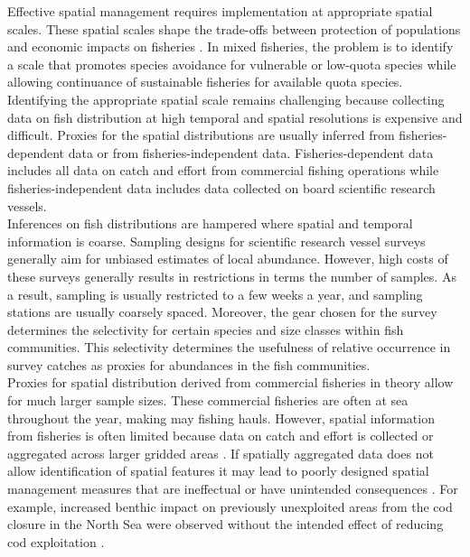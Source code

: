 \documentclass[preprint]{elsarticle}
\begin{document}
Effective spatial management requires implementation at appropriate spatial
scales. These spatial scales shape the trade-offs between protection of
populations and economic impacts on fisheries \citep{Dunn2016}. In mixed
fisheries, the problem is to identify a scale that promotes species avoidance
for vulnerable or low-quota species while allowing continuance of sustainable
fisheries for available quota species. Identifying the appropriate spatial
scale remains challenging because collecting data on fish distribution at high
temporal and spatial resolutions is expensive and difficult. Proxies for the
spatial distributions are usually inferred from fisheries-dependent data or
from fisheries-independent data. Fisheries-dependent data includes all data on
catch and effort from commercial fishing operations while fisheries-independent
data includes data collected on board scientific research vessels. \\

Inferences on fish distributions are hampered where spatial and temporal
information is coarse. Sampling designs for scientific research vessel surveys
generally aim for unbiased estimates of local abundance. However, high costs of
these surveys generally results in restrictions in terms the number of samples.
As a result, sampling is usually restricted to a few weeks a year, and sampling
stations are usually coarsely spaced. Moreover, the gear chosen for the survey
determines the selectivity for certain species and size classes within fish
communities. This selectivity determines the usefulness of relative occurrence
in survey catches as proxies for abundances in the fish communities. \\

Proxies for spatial distribution derived from commercial fisheries in theory
allow for much larger sample sizes. These commercial fisheries are often at sea
throughout the year, making may fishing hauls. However, spatial information
from fisheries is often limited because data on catch and effort is collected
or aggregated across larger gridded areas \citep{Branch2005}. If spatially
aggregated data does not allow identification of spatial features it may lead
to poorly designed spatial management measures that are ineffectual or have
unintended consequences \citep{Costello2010, Dunn2016}. For example, increased
benthic impact on previously unexploited  areas from the cod closure in the
North Sea were observed without the intended effect of reducing cod
exploitation \citep{Rijnsdorp2001,Dinmore2003}. \\
\end{document}
